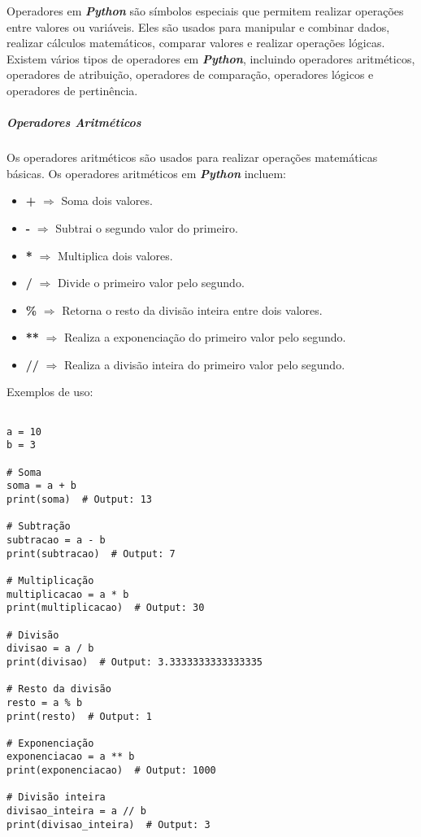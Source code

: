 \documentclass[a4paper, 12pt, onecolumn,singlespacing]{article}
\begin{document}
Operadores em \textbf{\textit{Python}} são símbolos especiais que permitem realizar operações entre valores ou variáveis. Eles são usados para manipular e combinar dados, realizar cálculos matemáticos, comparar valores e realizar operações lógicas. Existem vários tipos de operadores em \textbf{\textit{Python}}, incluindo operadores aritméticos, operadores de atribuição, operadores de comparação, operadores lógicos e operadores de pertinência.

	\subparagraph{Operadores Aritméticos}
	Os operadores aritméticos são usados para realizar operações matemáticas básicas. Os operadores aritméticos em \textbf{\textit{Python}} incluem:
	
	\begin{itemize}
		\item \textbf{+} $\Rightarrow$ Soma dois valores.
		\item \textbf{-} $\Rightarrow$ Subtrai o segundo valor do primeiro.
		\item \textbf{*} $\Rightarrow$ Multiplica dois valores.
		\item \textbf{/} $\Rightarrow$ Divide o primeiro valor pelo segundo.
		\item \textbf{\%} $\Rightarrow$ Retorna o resto da divisão inteira entre dois valores.
		\item \textbf{**} $\Rightarrow$ Realiza a exponenciação do primeiro valor pelo segundo.
		\item \textbf{//} $\Rightarrow$ Realiza a divisão inteira do primeiro valor pelo segundo.
	\end{itemize}

	Exemplos de uso:
	
\begin{verbatim}

a = 10
b = 3

# Soma
soma = a + b
print(soma)  # Output: 13

# Subtração
subtracao = a - b
print(subtracao)  # Output: 7

# Multiplicação
multiplicacao = a * b
print(multiplicacao)  # Output: 30

# Divisão
divisao = a / b
print(divisao)  # Output: 3.3333333333333335

# Resto da divisão
resto = a % b
print(resto)  # Output: 1

# Exponenciação
exponenciacao = a ** b
print(exponenciacao)  # Output: 1000

# Divisão inteira
divisao_inteira = a // b
print(divisao_inteira)  # Output: 3
		
\end{verbatim}
\end{document}
